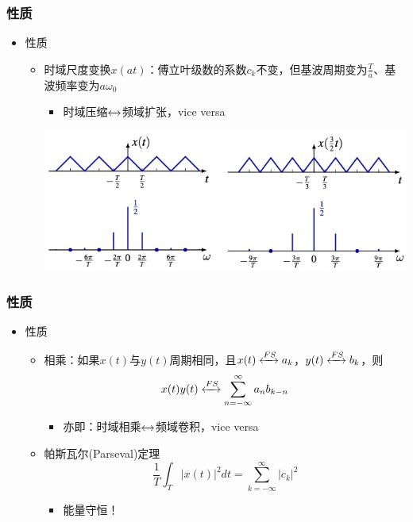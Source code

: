 \documentclass[CJKutf8,xcolor=pdftex,dvipsnames,table]{beamer}
\begin{document}
\begin{CJK*}{UTF8}{song}
  \begin{frame}
    \frametitle{性质}
    \begin{itemize}
    \item 性质
    	\begin{itemize}
		\item 时域尺度变换$x(at)$：傅立叶级数的系数$c_k$不变，但基波周期变为$\frac{T}{a}$、基波频率变为$a\omega_0$
			\begin{itemize}
			\item 时域压缩$\xleftrightarrow{}$频域扩张，vice versa
			\end{itemize}
			\begin{center}
      		\includegraphics[scale=.5]{timescaling}
    		\end{center}
    	\end{itemize}
	\end{itemize}
  \end{frame}     
    
  \begin{frame}
    \frametitle{性质}
    \begin{itemize}
    \item 性质
    	\begin{itemize}
		\item 相乘：如果$x(t)$与$y(t)$周期相同，且$x(t) \xleftrightarrow{FS} a_k$，$y(t) \xleftrightarrow{FS} b_k$，则\[x(t)y(t) \xleftrightarrow{FS} \sum_{n=-\infty}^{\infty}a_n b_{k-n}\]
			\begin{itemize}
			\item 亦即：时域相乘$\xleftrightarrow{}$频域卷积，vice versa
			\end{itemize}
		\item 帕斯瓦尔(Parseval)定理\[ \frac{1}{T}\int_{T}|x(t)|^2dt = \sum_{k=-\infty}^{\infty} |c_k|^2 \]
			\begin{itemize}
			\item 能量守恒！
			\end{itemize}
    	\end{itemize}
	\end{itemize}
  \end{frame}        
    

\end{CJK*}
\end{document}
